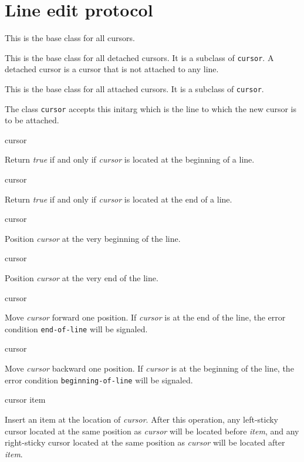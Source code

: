 \section{Line edit protocol}
\label{sec-edit-protocol}


This is the base class for all cursors.


This is the base class for all detached cursors.  It is a subclass of
\texttt{cursor}.  A detached cursor is a cursor that is not attached
to any line.


This is the base class for all attached cursors.  It is a subclass of
\texttt{cursor}.


The class \texttt{cursor} accepts this initarg which is the line to
which the new cursor is to be attached.

 {cursor}

Return \textit{true} if and only if \textit{cursor} is located at the
beginning of a line.

 {cursor}

Return \textit{true} if and only if \textit{cursor} is located at the
end of a line.

 {cursor}

Position \textit{cursor} at the very beginning of the line.

 {cursor}

Position \textit{cursor} at the very end of the line.

 {cursor}

Move \textit{cursor} forward one position.  If \emph{cursor} is at the
end of the line, the error condition \texttt{end-of-line} will be
signaled.

 {cursor}

Move \textit{cursor} backward one position.  If \emph{cursor} is at
the beginning of the line, the error condition
\texttt{beginning-of-line} will be signaled.

 {cursor item}

Insert an item at the location of \textit{cursor}.  After this
operation, any left-sticky cursor located at the same position as
\textit{cursor} will be located before \textit{item}, and any
right-sticky cursor located at the same position as \textit{cursor}
will be located after \textit{item}.

